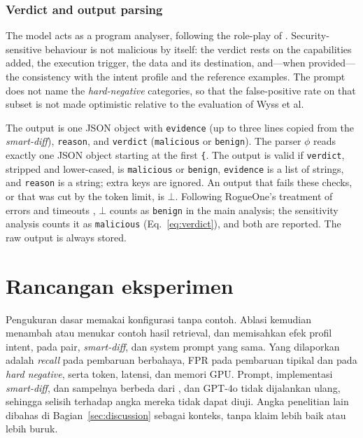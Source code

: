 \documentclass[a4paper,fleqn]{cas-dc}
\begin{document}
\subsubsection{Verdict and output parsing}\label{sec:verdict}

The model acts as a program analyser, following the role-play of
\citet{wyss2025evaluating}. Security-sensitive behaviour is not malicious by
itself: the verdict rests on the capabilities added, the execution trigger,
the data and its destination, and---when provided---the consistency with the
intent profile and the reference examples. The prompt does not name the
\emph{hard-negative} categories, so that the false-positive rate on that
subset is not made optimistic relative to the evaluation of Wyss et al.

The output is one JSON object with \texttt{evidence} (up to three lines copied
from the \emph{smart-diff}), \texttt{reason}, and \texttt{verdict}
(\texttt{malicious} or \texttt{benign}). The parser $\phi$ reads exactly one
JSON object starting at the first \texttt{\{}. The output is valid if
\texttt{verdict}, stripped and lower-cased, is \texttt{malicious} or
\texttt{benign}, \texttt{evidence} is a list of strings, and \texttt{reason}
is a string; extra keys are ignored. An output that fails these checks, or
that was cut by the token limit, is $\bot$. Following RogueOne's treatment of
errors and timeouts \citep{sofaer2024rogueone}, $\bot$ counts as
\texttt{benign} in the main analysis; the sensitivity analysis counts it as
\texttt{malicious} (Eq.~\ref{eq:verdict}), and both are reported. The raw
output is always stored.

\section{Rancangan eksperimen}\label{sec:setup}

Pengukuran dasar memakai konfigurasi tanpa contoh. Ablasi kemudian menambah
atau menukar contoh hasil retrieval, dan memisahkan efek profil intent, pada
pair, \emph{smart-diff}, dan system prompt yang sama. Yang dilaporkan adalah
\emph{recall} pada pembaruan berbahaya, FPR pada pembaruan tipikal dan pada
\emph{hard negative}, serta token, latensi, dan memori GPU. Prompt,
implementasi \emph{smart-diff}, dan sampelnya berbeda dari
\citet{wyss2025evaluating}, dan GPT-4o tidak dijalankan ulang, sehingga selisih
terhadap angka mereka tidak dapat diuji. Angka penelitian lain dibahas di
Bagian~\ref{sec:discussion} sebagai konteks, tanpa klaim lebih baik atau lebih
buruk.
\end{document}
